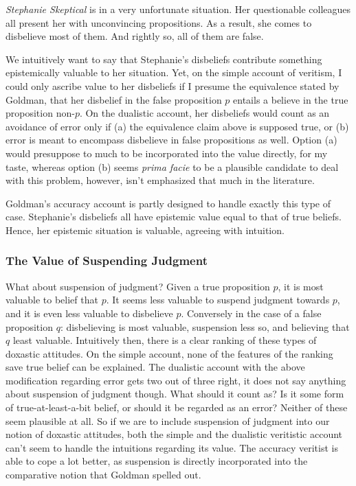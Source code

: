 \documentclass[12pt,numbers=noenddot]{scrartcl}
\begin{document}
\begin{description}
   \item \emph{Stephanie Skeptical} is in a very unfortunate situation. Her questionable colleagues all present her with unconvincing propositions. As a result, she comes to disbelieve most of them. And rightly so, all of them are false.
\end{description}

We intuitively want to say that Stephanie's disbeliefs contribute something epistemically valuable to her situation. Yet, on the simple account of veritism, I could only ascribe value to her disbeliefs if I presume the equivalence stated by Goldman, that her disbelief in the false proposition $p$ entails a believe in the true proposition non-$p$. On the dualistic account, her disbeliefs would count as an avoidance of error only if (a) the equivalence claim above is supposed true, or (b) error is meant to encompass disbelieve in false propositions as well. Option (a) would presuppose to much to be incorporated into the value directly, for my taste, whereas option (b) seems \emph{prima facie} to be a plausible candidate to deal with this problem, however, isn't emphasized that much in the literature.

Goldman's accuracy account is partly designed to handle exactly this type of case. Stephanie's disbeliefs all have epistemic value equal to that of true beliefs. Hence, her epistemic situation is valuable, agreeing with intuition.

\subsubsection{The Value of Suspending Judgment}

What about suspension of judgment? Given a true proposition $p$, it is most valuable to belief that $p$. It seems less valuable to suspend judgment towards $p$, and it is even less valuable to disbelieve $p$. Conversely in the case of a false proposition $q$: disbelieving is most valuable, suspension less so, and believing that $q$ least valuable. Intuitively then, there is a clear ranking of these types of doxastic attitudes. On the simple account, none of the features of the ranking save true belief can be explained. The dualistic account with the above modification regarding error gets two out of three right, it does not say anything about suspension of judgment though. What should it count as? Is it some form of true-at-least-a-bit belief, or should it be regarded as an error? Neither of these seem plausible at all. So if we are to include suspension of judgment into our notion of doxastic attitudes, both the simple and the dualistic veritistic account can't seem to handle the intuitions regarding its value. The accuracy veritist is able to cope a lot better, as suspension is directly incorporated into the comparative notion that Goldman spelled out.
\end{document}
